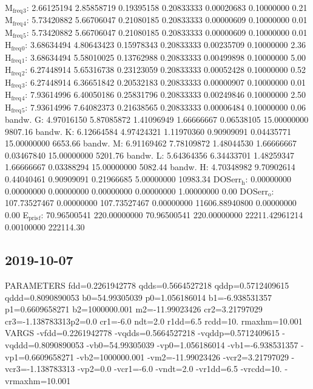 \documentclass[11pt]{article}
\begin{document}
M\(_{\text{freq}}\)\(_{\text{3}}\):   2.66125194   2.85858719   0.19395158   0.20833333   0.00020683   0.10000000         0.21
M\(_{\text{freq}}\)\(_{\text{4}}\):   5.73420882   5.66706047   0.21080185   0.20833333   0.00000609   0.10000000         0.01
M\(_{\text{freq}}\)\(_{\text{5}}\):   5.73420882   5.66706047   0.21080185   0.20833333   0.00000609   0.10000000         0.01
H\(_{\text{freq}}\)\(_{\text{0}}\):   3.68634494   4.80643423   0.15978343   0.20833333   0.00235709   0.10000000         2.36
H\(_{\text{freq}}\)\(_{\text{1}}\):   3.68634494   5.58010025   0.13762988   0.20833333   0.00499898   0.10000000         5.00
H\(_{\text{freq}}\)\(_{\text{2}}\):   6.27448914   5.65316738   0.23123059   0.20833333   0.00052428   0.10000000         0.52
H\(_{\text{freq}}\)\(_{\text{3}}\):   6.27448914   6.36651842   0.20532183   0.20833333   0.00000907   0.10000000         0.01
H\(_{\text{freq}}\)\(_{\text{4}}\):   7.93614996   6.40050186   0.25831796   0.20833333   0.00249846   0.10000000         2.50
H\(_{\text{freq}}\)\(_{\text{5}}\):   7.93614996   7.64082373   0.21638565   0.20833333   0.00006484   0.10000000         0.06
bandw. G:   4.97016150   5.87085872   1.41096949   1.66666667   0.06538105  15.00000000      9807.16
bandw. K:   6.12664584   4.97424321   1.11970360   0.90909091   0.04435771  15.00000000      6653.66
bandw. M:   6.91169462   7.78109872   1.48044530   1.66666667   0.03467840  15.00000000      5201.76
bandw. L:   5.64364356   6.34433701   1.48259347   1.66666667   0.03388294  15.00000000      5082.44
bandw. H:   4.70348982   9.70902614   0.44040461   0.90909091   0.21966685   5.00000000     10983.34
DOSerr\(_{\text{h}}\):   0.00000000   0.00000000   0.00000000   0.00000000   0.00000000   1.00000000         0.00
DOSerr\(_{\text{o}}\): 107.73527467   0.00000000 107.73527467   0.00000000 11606.88940800   0.00000000         0.00
E\(_{\text{pris}}\)\(_{\text{f}}\):  70.96500541 220.00000000  70.96500541 220.00000000 22211.42961214   0.00100000    222114.30



\subsection{2019-10-07}
\label{sec:orga7f282a}
PARAMETERS
 fdd=0.2261942778 qdds=0.5664527218 qddp=0.5712409615 qddd=0.8090890053 b0=54.99305039 p0=1.056186014 b1=-6.938531357 p1=0.6609658271 b2=1000000.001 m2=-11.99023426 cr2=3.21797029 cr3=-1.138783313p2=0.0 cr1=-6.0 ndt=2.0 r1dd=6.5 rcdd=10. rmaxhm=10.001 
VARGS
    -vfdd=0.2261942778 -vqdds=0.5664527218 -vqddp=0.5712409615 -vqddd=0.8090890053 -vb0=54.99305039 -vp0=1.056186014 -vb1=-6.938531357 -vp1=0.6609658271 -vb2=1000000.001 -vm2=-11.99023426 -vcr2=3.21797029 -vcr3=-1.138783313 -vp2=0.0 -vcr1=-6.0 -vndt=2.0 -vr1dd=6.5 -vrcdd=10. -vrmaxhm=10.001 
\end{document}
